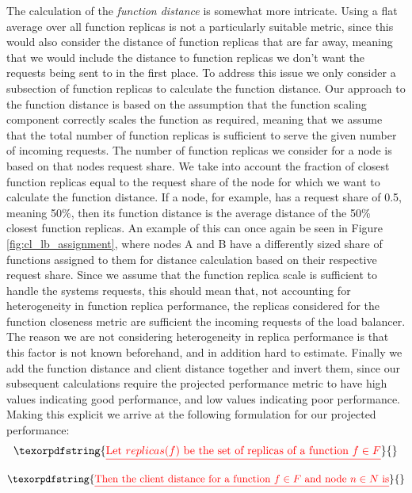 \documentclass[draft,final]{vutinfth} %
\providecommand{\DIFdeltex}[1]{{\protect\color{red}\sout{#1}}}                      %
\providecommand{\DIFaddbegin}{} %
\providecommand{\DIFdelbegin}{} %
\providecommand{\DIFdelend}{} %
\providecommand{\DIFdel}[1]{\texorpdfstring{\DIFdeltex{#1}}{}} %
\begin{document}
The calculation of the \textit{function distance} is somewhat more intricate.
Using a flat average over all function replicas is not a particularly suitable metric, since this would also consider the distance of function replicas that are far away, meaning that we would include the distance to function replicas we don't want the requests being sent to in the first place.
To address this issue we only consider a subsection of function replicas to calculate the function distance.
Our approach to the function distance is based on the assumption that the function scaling component correctly scales the function as required, meaning that we assume that the total number of function replicas is sufficient to serve the given number of incoming requests.
The number of function replicas we consider for a node is based on that nodes request share. We take into account the fraction of closest function replicas equal to the request share of the node for which we want to calculate the function distance.
If a node, for example, has a request share of 0.5, meaning 50\%, then its function distance is the average distance of the 50\% closest function replicas.
An example of this can once again be seen in Figure \ref{fig:cl_lb_assignment}, where nodes A and B have a differently sized share of functions assigned to them for distance calculation based on their respective request share.
Since we assume that the function replica scale is sufficient to handle the systems requests, this should mean that, not accounting for heterogeneity in function replica performance, the replicas considered for the function closeness metric are sufficient the incoming requests of the load balancer.
The reason we are not considering heterogeneity in replica performance is that this factor is not known beforehand, and in addition hard to estimate.
Finally we add the function distance and client distance together and invert them, since our subsequent calculations require the projected performance metric to have high values indicating good performance, and low values indicating poor performance.
Making this explicit we arrive at the following formulation for our projected performance:
\DIFdelbegin \[\DIFdel{\text{Let } replicas(f) \text{ be the set of replicas of a function }f \in F}\]%
\[\DIFdel{\text{Then the client distance for a function }f \in F \text{ and node }n \in N \text{ is}}\]%
\DIFdelend \DIFaddbegin 
\end{document}
